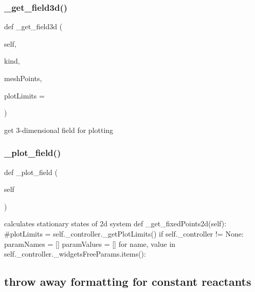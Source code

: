 \subsubsection{\texorpdfstring{\+\_\+get\+\_\+field3d()}{\_get\_field3d()}}
{\footnotesize\ttfamily def \+\_\+get\+\_\+field3d (\begin{DoxyParamCaption}\item[{}]{self,  }\item[{}]{kind,  }\item[{}]{mesh\+Points,  }\item[{}]{plot\+Limits = {} }\end{DoxyParamCaption})\hspace{0.3cm}{\ttfamily [private]}}



get 3-\/dimensional field for plotting 

\mbox{\label{class_mu_mo_t_1_1_mu_mo_t_1_1_mu_mo_tfield_view_a50d59419298116f738a98c864afb9d89}} 
\subsubsection{\texorpdfstring{\+\_\+plot\+\_\+field()}{\_plot\_field()}}
{\footnotesize\ttfamily def \+\_\+plot\+\_\+field (\begin{DoxyParamCaption}\item[{}]{self }\end{DoxyParamCaption})\hspace{0.3cm}{\ttfamily [private]}}



calculates stationary states of 2d system def \+\_\+get\+\_\+fixed\+Points2d(self)\+: \#plot\+Limits = self.\+\_\+controller.\+\_\+get\+Plot\+Limits() if self.\+\_\+controller != None\+: param\+Names = \mbox{[}\mbox{]} param\+Values = \mbox{[}\mbox{]} for name, value in self.\+\_\+controller.\+\_\+widgets\+Free\+Params.\+items()\+: \subsection*{throw away formatting for constant reactants}

